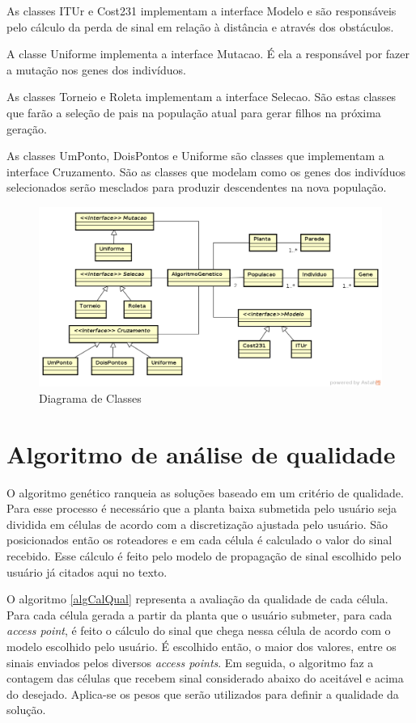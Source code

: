 \documentclass[tc,twoside]{iiufrgs}
\begin{document}
As classes ITUr e Cost231 implementam a interface Modelo e são responsáveis pelo cálculo da perda de sinal em relação à distância e através dos obstáculos.

A classe Uniforme implementa a interface Mutacao. É ela a responsável por fazer a mutação nos genes dos indivíduos.

As classes Torneio e Roleta implementam a interface Selecao. São estas classes que farão a seleção de pais na população atual para gerar filhos na próxima geração.

As classes UmPonto, DoisPontos e Uniforme são classes que implementam a interface Cruzamento. São as classes que modelam como os genes dos indivíduos selecionados serão mesclados para produzir descendentes na nova população. 

\begin{figure}[h]
\centering
\includegraphics[scale=0.5]{img/diagramaDeClasses.png}
\caption{Diagrama de Classes}
\label{fig:diagramaDeClasses}
\end{figure}

\section{Algoritmo de análise de qualidade}

O algoritmo genético ranqueia as soluções baseado em um critério de qualidade. Para esse processo é necessário que a planta baixa submetida pelo usuário seja dividida em células de acordo com a discretização ajustada pelo usuário. São posicionados então os roteadores e em cada célula é calculado o valor do sinal recebido. Esse cálculo é feito pelo modelo de propagação de sinal escolhido pelo usuário já citados aqui no texto. %
 
O algoritmo \ref{algCalQual} representa a avaliação da qualidade de cada célula. Para cada célula gerada a partir da planta que o usuário submeter, para cada \textit{access point}, é feito o cálculo do sinal que chega nessa célula de acordo com o modelo escolhido pelo usuário. É escolhido então, o maior dos valores, entre os sinais enviados pelos diversos \textit{access points}. Em seguida, o algoritmo faz a contagem das células que recebem sinal considerado abaixo do aceitável e acima do desejado. Aplica-se os pesos que serão utilizados para definir a qualidade da solução.     
\end{document}
